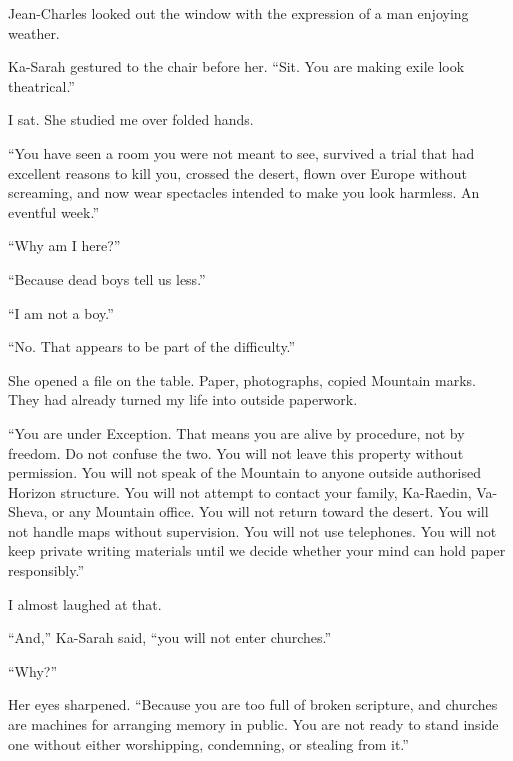 Jean-Charles looked out the window with the expression of a man enjoying weather.\par

Ka-Sarah gestured to the chair before her. ``Sit. You are making exile look theatrical.''\par

I sat. She studied me over folded hands.\par

``You have seen a room you were not meant to see, survived a trial that had excellent reasons to kill you, crossed the desert, flown over Europe without screaming, and now wear spectacles intended to make you look harmless. An eventful week.''\par

``Why am I here?''\par

``Because dead boys tell us less.''\par

``I am not a boy.''\par

``No. That appears to be part of the difficulty.''\par

She opened a file on the table. Paper, photographs, copied Mountain marks. They had already turned my life into outside paperwork.\par

``You are under Exception. That means you are alive by procedure, not by freedom. Do not confuse the two. You will not leave this property without permission. You will not speak of the Mountain to anyone outside authorised Horizon structure. You will not attempt to contact your family, Ka-Raedin, Va-Sheva, or any Mountain office. You will not return toward the desert. You will not handle maps without supervision. You will not use telephones. You will not keep private writing materials until we decide whether your mind can hold paper responsibly.''\par

I almost laughed at that.\par

``And,'' Ka-Sarah said, ``you will not enter churches.''\par

``Why?''\par

Her eyes sharpened. ``Because you are too full of broken scripture, and churches are machines for arranging memory in public. You are not ready to stand inside one without either worshipping, condemning, or stealing from it.''\par

